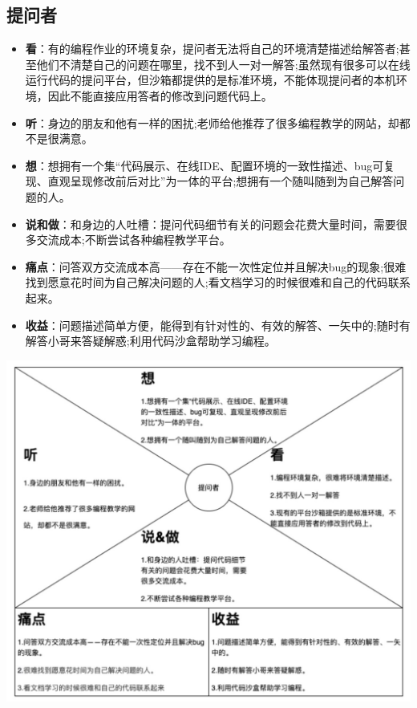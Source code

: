 \documentclass[a4paper]{ctexart}
\begin{document}
\subsection{提问者}
\begin{itemize}
  \item \textbf{看}：有的编程作业的环境复杂，提问者无法将自己的环境清楚描述给解答者;甚至他们不清楚自己的问题在哪里，找不到人一对一解答;虽然现有很多可以在线运行代码的提问平台，但沙箱都提供的是标准环境，不能体现提问者的本机环境，因此不能直接应用答者的修改到问题代码上。
  \item \textbf{听}：身边的朋友和他有一样的困扰;老师给他推荐了很多编程教学的网站，却都不是很满意。
  \item \textbf{想}：想拥有一个集“代码展示、在线IDE、配置环境的一致性描述、bug可复现、直观呈现修改前后对比”为一体的平台;想拥有一个随叫随到为自己解答问题的人。
  \item \textbf{说和做}：和身边的人吐槽：提问代码细节有关的问题会花费大量时间，需要很多交流成本;不断尝试各种编程教学平台。
  \item \textbf{痛点}：问答双方交流成本高——存在不能一次性定位并且解决bug的现象;很难找到愿意花时间为自己解决问题的人;看文档学习的时候很难和自己的代码联系起来。
  \item \textbf{收益}：问题描述简单方便，能得到有针对性的、有效的解答、一矢中的;随时有解答小哥来答疑解惑;利用代码沙盒帮助学习编程。
\end{itemize}

\begin{center}
  \includegraphics[width=14cm]{提问者.png}
\end{center}
\end{document}
